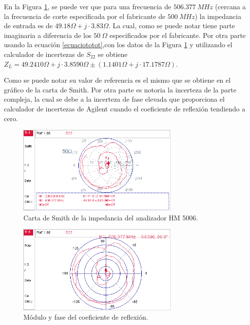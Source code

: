 \documentclass[a4paper,10pt]{article}
\begin{document}
		\indent En la Figura \ref{tranferenciacHM}, se puede ver que para una
		frecuencia de $506.377~MHz$ (cercana a la frecuencia de corte especificada por el fabricante de $500~MHz$) la 
		impedancia de entrada es de $49.18\Omega+j\cdot3.83\Omega$. La cual, como se puede notar tiene parte imaginaria a diferencia de los $50~\Omega$ especificados por el fabricante.
		Por otra parte usando la ecuaci\'on \ref{ecuaciototot},con los datos de la Figura \ref{tranferenciacHM} y utilizando el calculador de incertezas de $S_{22}$ se obtiene
		$Z_L =49.2410\Omega + j\cdot 3.8590\Omega \pm (1.1401\Omega +j\cdot17.1787\Omega)$.
		
		Como se puede notar su valor de referencia es el mismo que se obtiene en el gr\'afico de la carta de Smith. Por otra parte es notoria la incerteza de la parte compleja, la cual se debe a la incerteza de fase elevada que proporciona el calculador de incertezas de Agilent cuando el coeficiente de reflexi\'on tendiendo a cero.
		\begin{figure}[!htb]
			\centering
			\includegraphics[width=8cm]
			{Imagenes/SmithimpedancaiHM5006.png}
			\caption{Carta de Smith de la impedancia del analizador HM 5006.}
			\label{tranferenciacHM} 
		\end{figure}
		
		\begin{figure}[!htb]
			\centering
			\includegraphics[width=8cm]
			{Imagenes/CoeficientereflexionHM.png}
			\caption{M\'odulo y fase del coeficiente de reflexi\'on.}
			\label{CoeficientereflexionHM} 
		\end{figure}		
		
		
			
\end{document}
